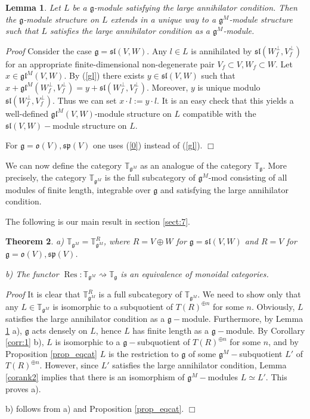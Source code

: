 \documentclass{svmult}
\newtheorem{theo}{Theorem}[section]
\newtheorem{lem}[theo]{Lemma}
\renewenvironment{proof}{ \emph{Proof}}{$\Box$}
\newcommand{\TT}{\mathbb{T}}
\renewcommand{\sp}{\mathfrak{sp}}
\renewcommand{\sl}{\mathfrak{sl}}
\newcommand{\oo}{\mathfrak{o}}
\renewcommand{\gg}{\mathfrak{g}}
\newcommand{\gl}{\mathfrak{gl}}
\begin{document}
\begin{lem}\label{corank1} Let $L$ be a $\gg$-module satisfying the large annihilator condition. Then the $\gg$-module
structure on $L$ extends in a unique way to a $\gg^M$-module structure such that $L$ satisfies  the large annihilator condition as a $\gg^M$-module.
\end{lem}

\begin{proof} Consider the case $\gg=\sl(V,W)$. Any $l\in L$ is annihilated by $\sl(W_f^\perp,V_f^\perp)$ for an appropriate finite-dimensional non-degenerate pair $V_f \subset V, W_f \subset W$.
Let $x\in \gl^M(V,W)$.
By (\ref{gl}) there exists $y\in \sl(V,W)$ such that $x+\gl^M(W_f^\perp,V_f^\perp)=y+\sl(W_f^\perp,V_f^\perp)$. Moreover, $y$ is unique modulo $\sl(W_f^\perp,V_f^\perp)$. Thus we can set $x \cdot l:=y \cdot l$. It is an easy check that this yields a well-defined $\gl^M(V,W)$-module structure on $L$ compatible with the $\sl(V,W)-$module structure on $L$. 

For $\gg = \oo(V),\sp(V)$ one uses (\ref{0}) instead of (\ref{gl}).
\end{proof}


\vspace{0.33cm}

We can now define the category $\TT_{\gg^M}$ as an analogue of the category $\TT_\gg$. More precisely, the category $\TT_{\gg^M}$ is the full subcategory of $\gg^M$-mod consisting of all modules of finite length, 
integrable over $\gg$ and satisfying the large annihilator condition.

The following is our main result in section \ref{sect:7}.
\begin{theo}\label{mainres_sect7}
 a) $\TT_{\gg^M} = \TT_{\gg^M}^R$, where $R = V\oplus W$ for $\gg = \sl(V,W)$ and $R=V$ for $\gg = \oo(V), \sp(V)$.
 
 b) The functor $\operatorname{Res}:\TT_{\gg^M} \rightsquigarrow \TT_\gg$ is an equivalence of monoidal categories.
\end{theo}
\begin{proof}
 It is clear that $\TT_{\gg^M}^R$ is a full subcategory of $\TT_{\gg^M}$. We need to show only that any $L \in \TT_{\gg^M}$ is isomorphic to a subquotient of $T(R)^{\oplus n}$ for some $n$. Obviously, $L$ satisfies the large annihilator condition as a $\gg-$module. Furthermore, by Lemma \ref{corank1} a), $\gg$ acts densely on $L$, hence $L$ has finite length as a $\gg-$module. By Corollary \ref{corr:1} b), $L$ is isomorphic to a $\gg-$subquotient of $T(R)^{\oplus n}$ for some $n$, and by Proposition \ref{prop_eqcat} $L$ is the restriction to $\gg$ of some $\gg^M-$subquotient $L'$ of $T(R)^{\oplus n}$. However, since $L'$ satisfies the large annihilator condition, Lemma \ref{corank2} implies that there is an isomorphism of $\gg^M-$modules $L\simeq L'$. This proves a).
 
 b) follows from a) and Proposition \ref{prop_eqcat}.
\end{proof}
\end{document}
